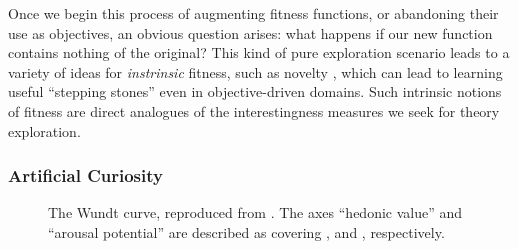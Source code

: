 \documentclass[]{article}
\begin{document}
Once we begin this process of augmenting fitness functions, or abandoning their use as objectives, an obvious question arises: what happens if our new function contains nothing of the original? This kind of pure exploration scenario leads to a variety of ideas for \emph{instrinsic} fitness, such as novelty \cite{lehman2011abandoning}, which can lead to learning useful ``stepping stones'' even in objective-driven domains. Such intrinsic notions of fitness are direct analogues of the interestingness measures we seek for theory exploration.

\subsubsection{Artificial Curiosity}
\label{curiosity}

\begin{figure}
  \centering

  \caption{The Wundt curve, reproduced from \cite{berlyne1970novelty}. The axes ``hedonic value'' and ``arousal potential'' are described as covering , and , respectively.}

  \label{wundt}
\end{figure}
\end{document}
